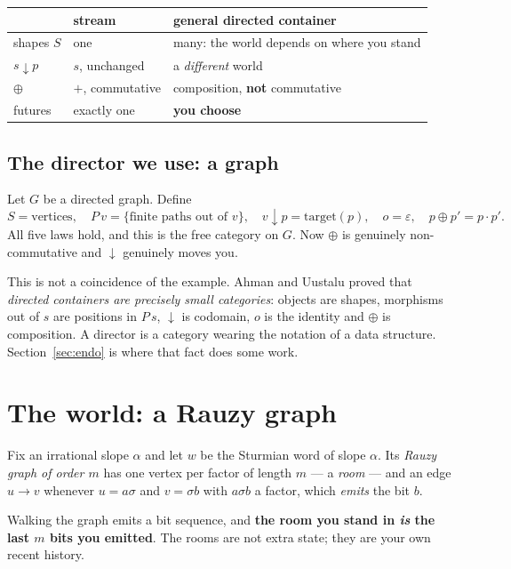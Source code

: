 \documentclass[11pt,a4paper]{article}
\theoremstyle{definition}
\theoremstyle{plain}
\theoremstyle{remark}
\begin{document}
\begin{center}
\begin{tabular}{lll}
\toprule
 & stream & general directed container \\
\midrule
shapes $S$        & one                 & many: the world depends on where you stand \\
$s \downarrow p$  & $s$, unchanged      & a \emph{different} world \\
$\oplus$          & $+$, commutative    & composition, \textbf{not} commutative \\
futures           & exactly one         & \textbf{you choose} \\
\bottomrule
\end{tabular}
\end{center}

\subsection{The director we use: a graph}

Let $G$ be a directed graph. Define
\[
  S = \text{vertices}, \quad
  P\,v = \{\text{finite paths out of } v\}, \quad
  v \downarrow p = \mathrm{target}(p), \quad
  o = \varepsilon, \quad
  p \oplus p' = p \cdot p'.
\]
All five laws hold, and this is the free category on $G$. Now $\oplus$ is
genuinely non-commutative and $\downarrow$ genuinely moves you.

This is not a coincidence of the example. Ahman and Uustalu proved that
\emph{directed containers are precisely small categories}: objects are shapes,
morphisms out of $s$ are positions in $P\,s$, $\downarrow$ is codomain, $o$ is
the identity and $\oplus$ is composition. A director is a category wearing the
notation of a data structure. Section~\ref{sec:endo} is where that fact does
some work.

\section{The world: a Rauzy graph}

Fix an irrational slope $\alpha$ and let $w$ be the Sturmian word of slope
$\alpha$. Its \emph{Rauzy graph of order $m$} has one vertex per factor of
length $m$ --- a \emph{room} --- and an edge $u \to v$ whenever $u = a\sigma$
and $v = \sigma b$ with $a\sigma b$ a factor, which \emph{emits} the bit $b$.

Walking the graph emits a bit sequence, and \textbf{the room you stand in
\emph{is} the last $m$ bits you emitted}. The rooms are not extra state; they
are your own recent history.
\end{document}
